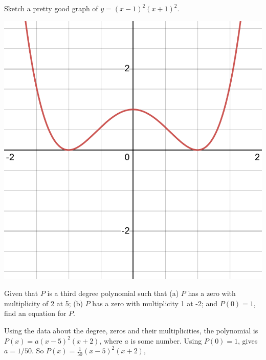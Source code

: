 \documentclass[12pt,fleqn,answers]{exam}
\begin{document}
\begin{questions}
\question Sketch a pretty good graph of $y = (x-1)^2 (x+1)^2$.
\begin{solution}[3.25in]
    \includegraphics[scale=0.25]{desmos-graph(41).png}
\end{solution}

\question [1]  Given that $P$ is a third degree polynomial such that
(a) $P$ has a zero with multiplicity of 2 at 5; (b) $P$ has a zero with multiplicity 1 
at -2; and $P(0) = 1$, find an equation for $P$.

\begin{solution} Using the data about the degree, zeros and their multiplicities, the polynomial is $P(x) = a (x-5)^2 (x+2)$,
where $a$ is some number. Using  $P(0) = 1$, gives $a=1/50$. So $P(x) = \frac{1}{50} (x-5)^2 (x+2)$,

\end{solution}
\end{questions}
\end{document}
